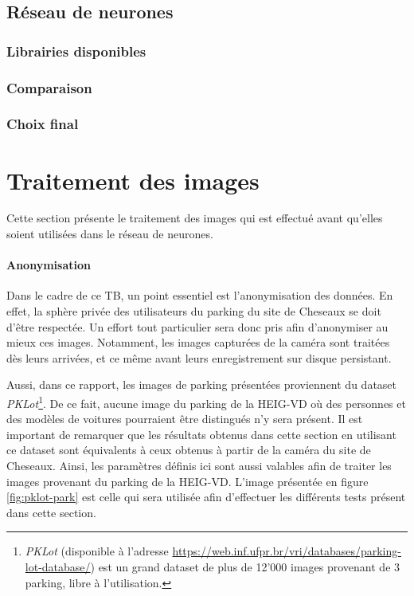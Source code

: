 \subsection{Réseau de neurones}
\subsubsection{Librairies disponibles}
\subsubsection{Comparaison}
\subsubsection{Choix final}

\section{Traitement des images}\label{conception.traitement}
Cette section présente le traitement des images qui est effectué avant qu'elles soient utilisées dans le réseau de neurones. 

\paragraph{Anonymisation}
Dans le cadre de ce TB, un point essentiel est l'anonymisation des données. En effet, la sphère privée des utilisateurs du parking du site de Cheseaux se doit d'être respectée. Un effort tout particulier sera donc pris afin d'anonymiser au mieux ces images. Notamment, les images capturées de la caméra sont traitées dès leurs arrivées, et ce même avant leurs enregistrement sur disque persistant. 

Aussi, dans ce rapport, les images de parking présentées proviennent du dataset \textit{PKLot}\footnote{\textit{PKLot} (disponible à l'adresse \url{https://web.inf.ufpr.br/vri/databases/parking-lot-database/}) est un grand dataset de plus de 12'000 images provenant de 3 parking, libre à l'utilisation.\autocite{paper:pklot}}. De ce fait, aucune image du parking de la HEIG-VD où des personnes et des modèles de voitures pourraient être distingués n'y sera présent. Il est important de remarquer que les résultats obtenus dans cette section en utilisant ce dataset sont équivalents à ceux obtenus à partir de la caméra du site de Cheseaux. Ainsi, les paramètres définis ici sont aussi valables afin de traiter les images provenant du parking de la HEIG-VD. L'image présentée en figure \ref{fig:pklot-park} est celle qui sera utilisée afin d'effectuer les différents tests présent dans cette section.

